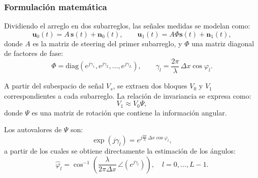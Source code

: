 \subsubsection*{Formulación matemática}

Dividiendo el arreglo en dos subarreglos, las señales medidas se modelan como:
\begin{equation}
	\mathbf{u}_0(t) = A\, \mathbf{s}(t) + \mathbf{n}_0(t), 
	\qquad 
	\mathbf{u}_1(t) = A \Phi \mathbf{s}(t) + \mathbf{n}_1(t),
\end{equation}
donde $A$ es la matriz de steering del primer subarreglo, 
y $\Phi$ una matriz diagonal de factores de fase:
\[
\Phi = \mathrm{diag}\left(e^{j\gamma_1}, e^{j\gamma_2}, \dots, e^{j\gamma_L}\right), 
\qquad \gamma_l = \frac{2\pi}{\lambda}\, \Delta x \cos\varphi_l.
\]

A partir del subespacio de señal $V_s$, se extraen dos bloques $V_0$ y $V_1$ 
correspondientes a cada subarreglo.  
La relación de invariancia se expresa como:
\begin{equation}
	V_1 \approx V_0 \Psi,
\end{equation}
donde $\Psi$ es una matriz de rotación que contiene la información angular.

Los autovalores de $\Psi$ son:
\[
\exp(j \gamma_l) = e^{j \tfrac{2\pi}{\lambda}\, \Delta x \cos\varphi_l},
\]
a partir de los cuales se obtiene directamente la estimación de los ángulos:
\begin{equation}
	\hat{\varphi}_l = \cos^{-1}\!\left( \frac{\lambda}{2\pi \Delta x} \, \angle(e^{j \gamma_l}) \right), 
	\quad l=0,\dots,L-1.
\end{equation}
